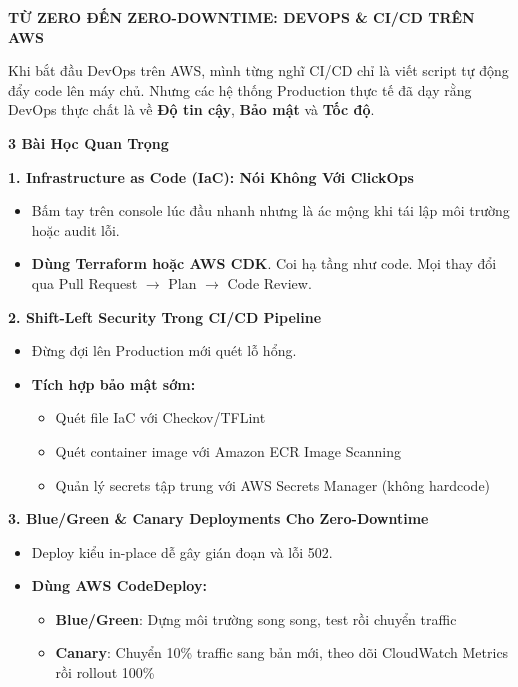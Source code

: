 \vspace{0.5em}\noindent\textbf{TỪ ZERO ĐẾN ZERO-DOWNTIME: DEVOPS \& CI/CD TRÊN
AWS}\par

Khi bắt đầu DevOps trên AWS, mình từng nghĩ CI/CD chỉ là viết script tự
động đẩy code lên máy chủ. Nhưng các hệ thống Production thực tế đã dạy
rằng DevOps thực chất là về \textbf{Độ tin cậy}, \textbf{Bảo mật} và
\textbf{Tốc độ}.

\vspace{0.5em}\noindent\textbf{3 Bài Học Quan Trọng}\par

\vspace{0.5em}\noindent\textbf{1. Infrastructure as Code (IaC): Nói Không Với
ClickOps}\par

\begin{itemize}
\tightlist
\item
  Bấm tay trên console lúc đầu nhanh nhưng là ác mộng khi tái lập môi
  trường hoặc audit lỗi.
\item
  \textbf{Dùng Terraform hoặc AWS CDK}. Coi hạ tầng như code. Mọi thay
  đổi qua Pull Request \(\rightarrow\) Plan \(\rightarrow\) Code Review.
\end{itemize}

\vspace{0.5em}\noindent\textbf{2. Shift-Left Security Trong CI/CD
Pipeline}\par

\begin{itemize}
\tightlist
\item
  Đừng đợi lên Production mới quét lỗ hổng.
\item
  \textbf{Tích hợp bảo mật sớm:}

  \begin{itemize}
  \tightlist
  \item
    Quét file IaC với Checkov/TFLint
  \item
    Quét container image với Amazon ECR Image Scanning
  \item
    Quản lý secrets tập trung với AWS Secrets Manager (không hardcode)
  \end{itemize}
\end{itemize}

\vspace{0.5em}\noindent\textbf{3. Blue/Green \& Canary Deployments Cho
Zero-Downtime}\par

\begin{itemize}
\tightlist
\item
  Deploy kiểu in-place dễ gây gián đoạn và lỗi 502.
\item
  \textbf{Dùng AWS CodeDeploy:}

  \begin{itemize}
  \tightlist
  \item
    \textbf{Blue/Green}: Dựng môi trường song song, test rồi chuyển
    traffic
  \item
    \textbf{Canary}: Chuyển 10\% traffic sang bản mới, theo dõi
    CloudWatch Metrics rồi rollout 100\%
  \end{itemize}
\end{itemize}

